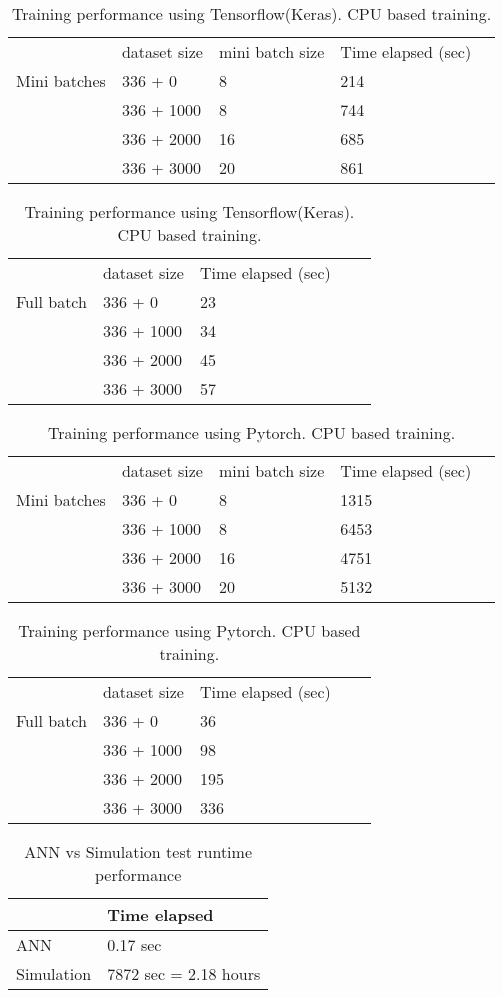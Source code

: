 \documentclass[draft, 10pt]{IEEEtran}
\begin{document}
\begin{table}
\begin{tabular}{lllll}
    & dataset size & mini batch size & Time elapsed (sec) \\
Mini batches    &336 + 0 & 8 & 214 & \\
    &336 + 1000 & 8 & 744 & \\
    &336 + 2000 & 16 & 685  & \\ 
    &336 + 3000 & 20 & 861  & \\
\end{tabular}
\begin{tabular}{lllll}
   & dataset size & Time elapsed (sec) \\
Full batch    &336 + 0 &  23 & \\
    &336 + 1000 &  34 & \\
    &336 + 2000 &  45 & \\ 
    &336 + 3000 &  57 & \\
\end{tabular}
\caption{Training performance using Tensorflow(Keras). CPU based training.}
\end{table}
\begin{table}
\begin{tabular}{lllll}
 & dataset size & mini batch size & Time elapsed (sec) \\
Mini batches    & 336 + 0 & 8 & 1315 & \\
    & 336 + 1000 & 8 & 6453  & \\
    & 336 + 2000 & 16 & 4751  & \\ 
    & 336 + 3000 & 20 & 5132 & \\
\end{tabular}
\begin{tabular}{lllll}
   &dataset size & Time elapsed (sec) \\
   Full batch &336 + 0 &  36  & \\
    & 336 + 1000 &  98  & \\
    & 336 + 2000 &  195  & \\ 
    & 336 + 3000 &  336  & \\
\end{tabular}
\caption{Training performance using Pytorch. CPU based training.}
\end{table}

\begin{table}[h]
\centering
\begin{tabular}{l|l}
      & Time elapsed \\
      \hline
    ANN &  0.17 sec \\
    \hline
    Simulation &  7872 sec = 2.18 hours  \\
\end{tabular}

\caption{ANN vs Simulation test runtime performance}
\end{table}
\newpage
\end{document}
